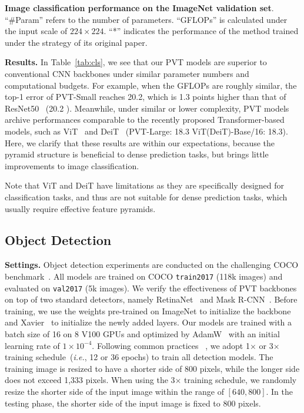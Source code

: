 \documentclass[10pt,twocolumn,letterpaper]{article}
\def\ie{\emph{i.e.}}
\begin{document}
\begin{table}[t]
    \centering
    \renewcommand\arraystretch{ 1.0}
    \setlength{\tabcolsep}{1.7mm}
    \footnotesize
    
    \caption{\textbf{Image classification performance on the ImageNet validation set}.
    ``\#Param'' refers to the number of parameters. 
    ``GFLOPs'' is calculated under the input scale of $224\times 224$. ``*'' indicates the performance of the method trained under the strategy of its original paper.}
    \label{tab:cls}
\end{table}
\noindent\textbf{Results.}
%
In Table~\ref{tab:cls}, we see that our PVT models are superior to conventional CNN backbones under similar parameter numbers and computational budgets.
%
For example, when the GFLOPs are roughly similar, the top-1 error of PVT-Small reaches 20.2, which is 1.3 points higher than that of ResNet50~\cite{he2016deep} (20.2 ).
%
Meanwhile, under similar or lower complexity, PVT models archive performances comparable to the recently proposed Transformer-based models, such as ViT~\cite{dosovitskiy2020image} and DeiT~\cite{touvron2020training} (PVT-Large: 18.3 \vs ViT(DeiT)-Base/16: 18.3).
%
Here, we clarify that these results are within our expectations, because the pyramid structure is beneficial to dense prediction tasks, but
brings little improvements to image classification.
%

Note that ViT and DeiT have limitations as they are specifically designed for classification tasks, and thus are not suitable for dense prediction tasks, which usually require effective feature pyramids.
%



\subsection{Object Detection}\label{sec:det}

\noindent\textbf{Settings.}
Object detection experiments are conducted on the challenging COCO benchmark~\cite{lin2014microsoft}.
%
All models are trained on COCO \texttt{train2017} (118k images) and evaluated on \texttt{val2017} (5k images).
%
We verify the effectiveness of PVT backbones on top of two standard detectors, namely RetinaNet~\cite{lin2017focal} and Mask R-CNN~\cite{he2017mask}.
Before training, we use the weights pre-trained on ImageNet to initialize the backbone and Xavier~\cite{glorot2010understanding} to initialize the newly added layers.
Our models are trained with a batch size of 16 on 8 V100 GPUs and optimized by AdamW~\cite{loshchilov2017decoupled} with an initial learning rate of $1\times10^{-4}$.
%
Following common practices~ \cite{lin2017focal,he2017mask,chen2019mmdetection}, we adopt 1$\times$ or 3$\times$ training schedule~(\ie, 12 or 36 epochs) to train all detection models.
%
The training image is resized to have a shorter side of 800 pixels, while the longer side does not exceed 1,333 pixels.
%
When using the 3$\times$ training schedule, we randomly resize the shorter side of the input image within the range of $[640, 800]$.
%
In the testing phase, the shorter side of the input image is fixed to 800 pixels.
%
\end{document}
